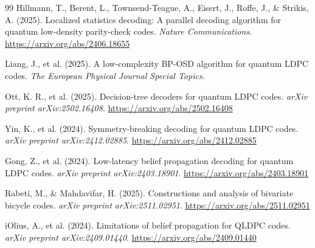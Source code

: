 \documentclass[twocolumn,10pt]{article}
\begin{document}
\begin{thebibliography}{99}
Hillmann, T., Berent, L., Townsend-Teague, A., Eisert, J., Roffe, J., \& Strikis, A. (2025).
Localized statistics decoding: A parallel decoding algorithm for quantum low-density
parity-check codes.
\textit{Nature Communications}.
\url{https://arxiv.org/abs/2406.18655}

Liang, J., et al. (2025).
A low-complexity BP-OSD algorithm for quantum LDPC codes.
\textit{The European Physical Journal Special Topics}.

Ott, K. R., et al. (2025).
Decision-tree decoders for quantum LDPC codes.
\textit{arXiv preprint arXiv:2502.16408}.
\url{https://arxiv.org/abs/2502.16408}

Yin, K., et al. (2024).
Symmetry-breaking decoding for quantum LDPC codes.
\textit{arXiv preprint arXiv:2412.02885}.
\url{https://arxiv.org/abs/2412.02885}

Gong, Z., et al. (2024).
Low-latency belief propagation decoding for quantum LDPC codes.
\textit{arXiv preprint arXiv:2403.18901}.
\url{https://arxiv.org/abs/2403.18901}

Rabeti, M., \& Mahdavifar, H. (2025).
Constructions and analysis of bivariate bicycle codes.
\textit{arXiv preprint arXiv:2511.02951}.
\url{https://arxiv.org/abs/2511.02951}

iOlius, A., et al. (2024).
Limitations of belief propagation for QLDPC codes.
\textit{arXiv preprint arXiv:2409.01440}.
\url{https://arxiv.org/abs/2409.01440}

\end{thebibliography}
\end{document}
